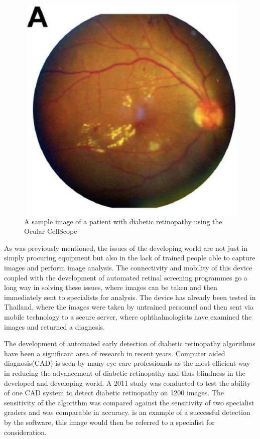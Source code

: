 \begin{figure}[htbp]
\centering
\includegraphics{figures/ocularDR}
\caption{A sample image of a patient with diabetic retinopathy using the Ocular CellScope \cite{medscape}}
\label{fig:odr}
\end{figure}

As was previously mentioned, the issues of the developing world are not just in simply
procuring equipment but also in the lack of trained people able to capture images and
perform image analysis. The connectivity and mobility of this device coupled with the
development of automated retinal screening programmes go a long way in solving these issues,
where images can be taken and then immediately sent to specialists for analysis. The
device has already been tested in Thailand, where the images were taken by untrained
personnel and then sent via mobile technology to a secure server, where ophthalmologists
have examined the images and returned a diagnosis. 

The development of automated early detection of diabetic retinopathy algorithms have
been a significant area of research in recent years. Computer aided diagnosis(CAD)
is seen by many eye-care professionals as the most efficient way in reducing the
advancement of diabetic retinopathy and thus blindness in the developed and developing
world. A 2011 study was conducted to test the ability of one CAD system to detect
diabetic retinopathy on 1200 images. The sensitivity of the algorithm was compared
against the sensitivity of two specialist graders and was comparable in accuracy.
\cite{sanchez2011evaluation}  is an example of a successful detection
by the software, this image would then be referred to a specialist for consideration.

